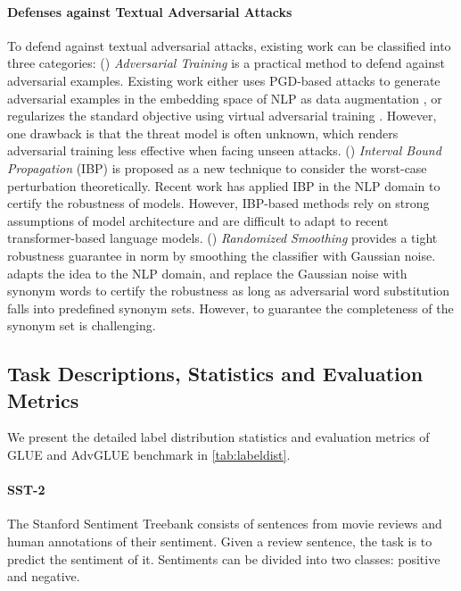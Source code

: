 \documentclass{article}
\newcommand{\method}{AdvGLUE\xspace}
\begin{document}
\paragraph{Defenses against Textual Adversarial Attacks} To defend against textual adversarial attacks, existing work can be classified into three categories:
() \textit{Adversarial Training} is a practical method to defend against adversarial examples. Existing work either uses PGD-based attacks to generate adversarial examples in the embedding space of NLP as data augmentation \citep{freelb}, or regularizes the standard objective using virtual adversarial training \citep{smart,alum,gan2020large}. However, one drawback is that the threat model is often unknown, which renders adversarial training less effective when facing unseen attacks.
() \textit{Interval Bound Propagation} (IBP) \citep{ibp} is proposed as a new technique to consider the worst-case perturbation theoretically. Recent work \citep{ibp1,ibp2} has applied IBP in the NLP domain to certify the robustness of models. However, IBP-based methods rely on strong assumptions of model architecture and are difficult to adapt to recent transformer-based language models. 
() \textit{Randomized Smoothing} \citep{DBLP:conf/icml/CohenRK19} provides a tight robustness guarantee in  norm by smoothing the classifier with Gaussian noise. \citet{safer} adapts the idea to the NLP domain, and replace the Gaussian noise with synonym words to certify the robustness as long as adversarial word substitution falls into predefined synonym sets. However, to guarantee the completeness of the synonym set is challenging.



\subsection{Task Descriptions, Statistics and Evaluation Metrics}
\label{appendix:tasks}


We present the detailed label distribution statistics and evaluation metrics of GLUE and \method benchmark in \ref{tab:labeldist}.

\paragraph{SST-2} The Stanford Sentiment Treebank \cite{socher2013recursive} consists of sentences from movie reviews and human annotations of their sentiment. Given a review sentence, the task is to predict the sentiment of it. Sentiments can be divided into two classes: positive and negative.
\end{document}
